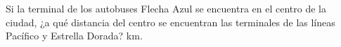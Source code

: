 Si la terminal de los autobuses Flecha Azul se encuentra en el centro de la ciudad, ¿a qué distancia del centro se encuentran las terminales de las líneas Pacífico y Estrella Dorada? \fillin[20][0.5cm] km.
